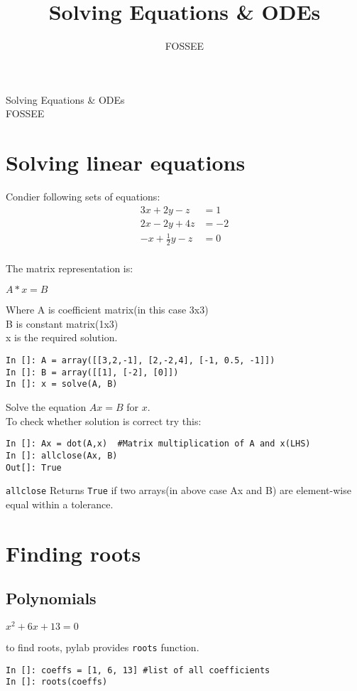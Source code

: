 \documentclass[12pt]{article}
\title{Solving Equations \& ODEs}
\author{FOSSEE}
\newcommand{\typ}[1]{\lstinline{#1}}
\begin{document}
\date{}
\vspace{-1in}
\begin{center}
\LARGE{Solving Equations \& ODEs}\\
\large{FOSSEE}
\end{center}
\section{Solving linear equations}
Condier following sets of equations:\\
  \begin{align*}
    3x + 2y - z  & = 1 \\
    2x - 2y + 4z  & = -2 \\
    -x + \frac{1}{2}y -z & = 0
  \end{align*}\\
The matrix representation is:\\
\begin{center}
$A*x = B$
\end{center}
Where A is coefficient matrix(in this case 3x3)\\
B is constant matrix(1x3)\\
x is the required solution.\\
\begin{lstlisting}
In []: A = array([[3,2,-1], [2,-2,4], [-1, 0.5, -1]])
In []: B = array([[1], [-2], [0]])
In []: x = solve(A, B)
\end{lstlisting}
Solve the equation $A x = B$ for $x$.\\
To check whether solution is correct try this:
\begin{lstlisting}
In []: Ax = dot(A,x)  #Matrix multiplication of A and x(LHS)
In []: allclose(Ax, B)
Out[]: True
\end{lstlisting}
\typ{allclose} Returns \typ{True} if two arrays(in above case Ax and B) are element-wise equal within a tolerance. 
\newpage
\section{Finding roots}
\subsection{Polynomials}
\begin{center}
  $x^2+6x+13=0$
\end{center}
to find roots, pylab provides \typ{roots} function.
\begin{lstlisting}
In []: coeffs = [1, 6, 13] #list of all coefficients
In []: roots(coeffs)
\end{lstlisting}
\end{document}
